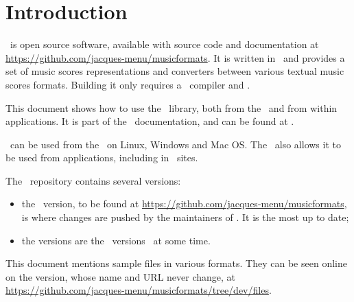 



\chapter{Introduction}

\mf\ is open source software, available with source code and documentation at \url{https://github.com/jacques-menu/musicformats}. It is written in \CPlusplus\ and provides a set of music scores representations and converters between various textual music scores formats. Building it only requires a \CPlusplus\ compiler and \cmake.

This document shows how to use the \mf\ library, both from the \CLI\ and from within applications. It is part of the \mf\ documentation, and can be found at .

\mf\ can be used from the \CLI\ on Linux, Windows and Mac OS. The \API\ also allows it to be used from applications, including in \Web\ sites.

The \mf\ repository contains several versions:
\begin{itemize}
\item the  \master\ version, to be found at \url{https://github.com/jacques-menu/musicformats}, is where changes are pushed by the maintainers of \mf. It is the most up to date;
\item the  versions are the \master\ versions \frozen\ at some time.
\end{itemize}

This document mentions sample files in various formats. They can be seen online on the  version, whose name and URL never change, at \url{https://github.com/jacques-menu/musicformats/tree/dev/files}.

